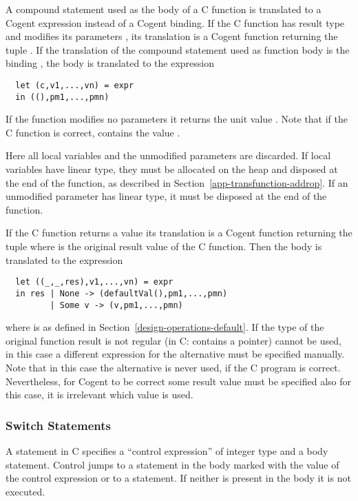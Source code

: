 A compound statement used as the body of a C function is translated to a Cogent expression instead of a Cogent binding.
If the C function has result type  and modifies its parameters , its translation is 
a Cogent function returning the tuple . If the translation of the compound statement
used as function body is the binding , the body is translated to the expression
\begin{verbatim}
  let (c,v1,...,vn) = expr
  in ((),pm1,...,pmn)
\end{verbatim}
If the function modifies no parameters
it returns the unit value \code{()}. Note that if the C function is correct,  contains the value .

Here all local variables and the unmodified parameters are discarded. If local variables have linear type, they must
be allocated on the heap and disposed at the end of the function, as described in Section~\ref{app-transfunction-addrop}.
If an unmodified parameter has linear type, it must be disposed at the end of the function.

If the C function returns a value its translation is a Cogent function returning the tuple 
where  is the original result value of the C function. Then the body is translated to the expression
\begin{verbatim}
  let ((_,_,res),v1,...,vn) = expr
  in res | None -> (defaultVal(),pm1,...,pmn)
         | Some v -> (v,pm1,...,pmn)
\end{verbatim}
where  is as defined in Section~\ref{design-operations-default}. If the type of the original function
result  is not regular (in C: contains a pointer)  cannot be used, in this case a different
expression for the  alternative must be specified manually. Note that in this case the  alternative
is never used, if the C program is correct. Nevertheless, for Cogent to be correct some result value must be specified 
also for this case, it is irrelevant which value is used.

\subsubsection{Switch Statements}

A  statement in C specifies a ``control expression'' of integer type and a body statement. Control jumps to a 
 statement in the body marked with the value of the control expression or to a  statement. If neither
is present in the body it is not executed.

